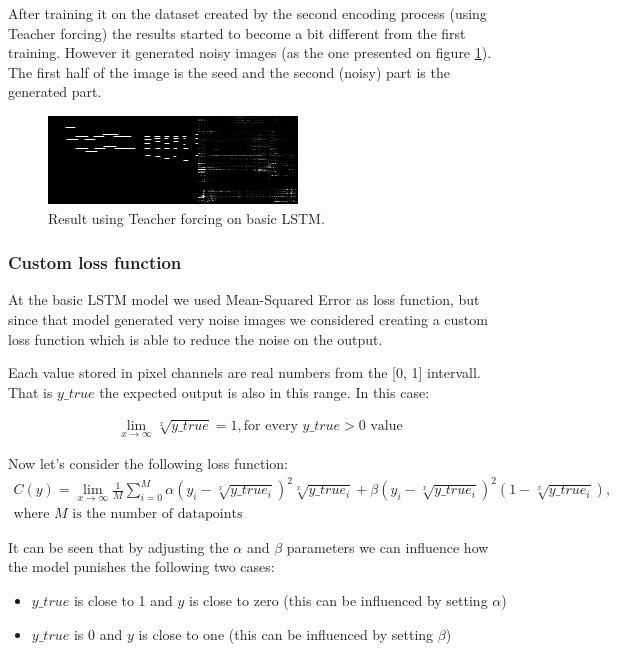 \documentclass{article}
\begin{document}
After training it on the dataset created by the second encoding process (using Teacher forcing) the results started to become a bit different from the first training. However it generated noisy images (as the one presented on figure \ref{fig:LSTMresult-1}). The first half of the image is the seed and the second (noisy) part is the generated part. 

\begin{figure}[!htb]
	\centering
	\includegraphics[width=0.8\linewidth]{LSTMresult1.png}
	\caption{Result using Teacher forcing on basic LSTM.}
	\label{fig:LSTMresult-1}
\end{figure}

\subsubsection{Custom loss function}

At the basic LSTM model we used Mean-Squared Error as loss function, but since that model generated very noise images we considered creating a custom loss function which is able to reduce the noise on the output. 

Each value stored in pixel channels are real numbers from the [0, 1] intervall. That is $y\_true$ the expected output is also in this range. In this case: 

\begin{gather}
\lim_{x\to\infty} \sqrt[x]{y\_true} = 1, \text{for every $y\_true > 0$ value}
\end{gather}

Now let's consider the following loss function: 
\begin{gather}
	C(y) = \lim_{x\to\infty} \frac{1}{M}\sum_{i = 0}^{M} \alpha(y_i - \sqrt[x]{y\_true_i})^{2}\sqrt[x]{y\_true_i} + \beta(y_i - \sqrt[x]{y\_true_i})^{2}(1 - \sqrt[x]{y\_true_i}), \\
	\text{where $M$ is the number of datapoints}
\end{gather}

It can be seen that by adjusting the $\alpha$ and $\beta$ parameters we can influence how the model punishes the following two cases: 
\begin{itemize}
	\item $y\_true$ is close to 1 and $y$ is close to zero (this can be influenced by setting $\alpha$)
	\item $y\_true$ is 0 and $y$ is close to one (this can be influenced by setting $\beta$)
\end{itemize}
\end{document}
